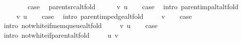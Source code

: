 \begin{isabellebody}
\isanewline
{}\isamarkupfalse%
\isanewline
\ \ \isamarkupfalse%
\ {}\isanewline
\ \ \isamarkupfalse%
\ {\isacharquery}{\kern0pt}case\ \isamarkupfalse%
\ parent{\isacharunderscore}{\kern0pt}src{\isacharunderscore}{\kern0pt}alt{\isacharunderscore}{\kern0pt}fold\ \isacommand{{\isachardot}{\kern0pt}}\isamarkupfalse%
\isanewline
{}\isamarkupfalse%
\isanewline
\ \ \isamarkupfalse%
\ {\isacharparenleft}{\kern0pt}{}\ v\ u{\isacharparenright}{\kern0pt}\isanewline
\ \ \isamarkupfalse%
\ {\isacharquery}{\kern0pt}case\ \isamarkupfalse%
\ {\isacharparenleft}{\kern0pt}intro\ parent{\isacharunderscore}{\kern0pt}imp{\isacharunderscore}{\kern0pt}alt{\isacharunderscore}{\kern0pt}alt{\isacharunderscore}{\kern0pt}fold{\isacharparenright}{\kern0pt}\isanewline
{}\isamarkupfalse%
\isanewline
\ \ \isamarkupfalse%
\ {\isacharparenleft}{\kern0pt}{}\ v\ u{\isacharparenright}{\kern0pt}\isanewline
\ \ \isamarkupfalse%
\ {\isacharquery}{\kern0pt}case\ \isamarkupfalse%
\ {\isacharparenleft}{\kern0pt}intro\ parent{\isacharunderscore}{\kern0pt}imp{\isacharunderscore}{\kern0pt}edge{\isacharunderscore}{\kern0pt}alt{\isacharunderscore}{\kern0pt}fold{\isacharparenright}{\kern0pt}\isanewline
{}\isamarkupfalse%
\isanewline
\ \ \isamarkupfalse%
\ {\isacharparenleft}{\kern0pt}{}\ v{\isacharparenright}{\kern0pt}\isanewline
\ \ \isamarkupfalse%
\ {\isacharquery}{\kern0pt}case\ \isamarkupfalse%
\ {\isacharparenleft}{\kern0pt}intro\ not{\isacharunderscore}{\kern0pt}white{\isacharunderscore}{\kern0pt}if{\isacharunderscore}{\kern0pt}mem{\isacharunderscore}{\kern0pt}queue{\isacharunderscore}{\kern0pt}alt{\isacharunderscore}{\kern0pt}fold{\isacharparenright}{\kern0pt}\isanewline
{}\isamarkupfalse%
\isanewline
\ \ \isamarkupfalse%
\ {\isacharparenleft}{\kern0pt}{}\ v\ u{\isacharparenright}{\kern0pt}\isanewline
\ \ \isamarkupfalse%
\ {\isacharquery}{\kern0pt}case\ \isamarkupfalse%
\ {\isacharparenleft}{\kern0pt}intro\ not{\isacharunderscore}{\kern0pt}white{\isacharunderscore}{\kern0pt}if{\isacharunderscore}{\kern0pt}parent{\isacharunderscore}{\kern0pt}alt{\isacharunderscore}{\kern0pt}fold{\isacharparenright}{\kern0pt}\isanewline
{}\isamarkupfalse%
\isanewline
\ \ \isamarkupfalse%
\ {\isacharparenleft}{\kern0pt}{}\ u\ v{\isacharparenright}{\kern0pt}\isanewline

\end{isabellebody}
